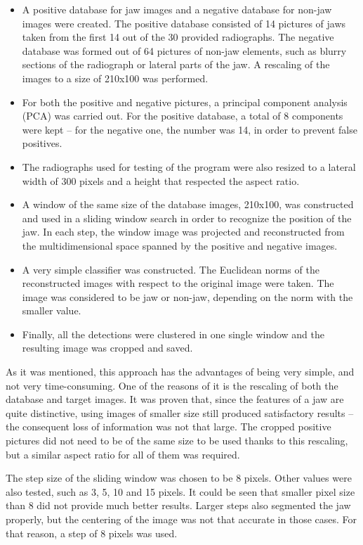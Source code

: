 \documentclass[a4paper,11pt,twoside]{article}
\begin{document}
\begin{itemize}
\item A positive database for jaw images and a negative database for non-jaw images were created. The positive database consisted of 14 pictures of jaws taken from the first 14 out of the 30 provided radiographs. The negative database was formed out of 64 pictures of non-jaw elements, such as blurry sections of the radiograph or lateral parts of the jaw. A rescaling of the images to a size of 210x100 was performed.
\item For both the positive and negative pictures, a principal component analysis (PCA) was carried out. For the positive database, a total of 8 components were kept -- for the negative one, the number was 14, in order to prevent false positives.
\item The radiographs used for testing of the program were also resized to a lateral width of 300 pixels and a height that respected the aspect ratio.
\item A window of the same size of the database images, 210x100, was constructed and used in a sliding window search in order to recognize the position of the jaw. In each step, the window image was projected and reconstructed from the multidimensional space spanned by the positive and negative images.
\item A very simple classifier was constructed. The Euclidean norms of the reconstructed images with respect to the original image were taken. The image was considered to be jaw or non-jaw, depending on the norm with the smaller value.
\item Finally, all the detections were clustered in one single window and the resulting image was cropped and saved.
\end{itemize}

As it was mentioned, this approach has the advantages of being very simple, and not very time-consuming. One of the reasons of it is the rescaling of both the database and target images. It was proven that, since the features of a jaw are quite distinctive, using images of smaller size still produced satisfactory results -- the consequent loss of information was not that large. The cropped positive pictures did not need to be of the same size to be used thanks to this rescaling, but a similar aspect ratio for all of them was required. 

The step size of the sliding window was chosen to be 8 pixels. Other values were also tested, such as 3, 5, 10 and 15 pixels. It could be seen that smaller pixel size than 8 did not provide much better results. Larger steps also segmented the jaw properly, but the centering of the image was not that accurate in those cases. For that reason, a step of 8 pixels was used. 
\end{document}
